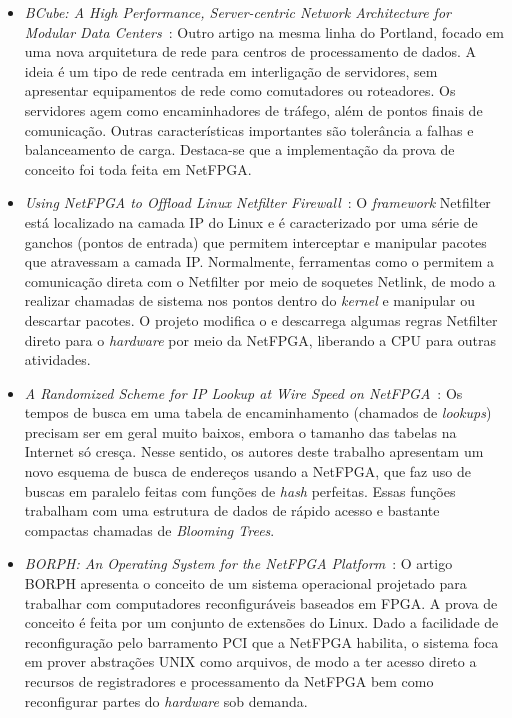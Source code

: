 \begin{itemize}
\item \textit{BCube: A High Performance, Server-centric Network
Architecture for Modular Data
Centers}~\cite{Guo:2009:BHP:1592568.1592577}: Outro artigo na mesma
linha do Portland, focado em uma nova arquitetura de rede para
centros de processamento de dados. A ideia é um tipo de rede
centrada em interligação de servidores, sem apresentar equipamentos
de rede como comutadores ou roteadores. Os servidores agem como
encaminhadores de tráfego, além de pontos finais de comunicação.
Outras características importantes são tolerância a falhas e
balanceamento de carga. Destaca-se que a implementação da prova de
conceito foi toda feita em NetFPGA.

\item \textit{Using NetFPGA to Offload Linux Netfilter
Firewall}~\cite{netfilter}: O \emph{framework} Netfilter está
localizado na camada IP do Linux e é caracterizado por uma série de
ganchos (pontos de entrada) que permitem interceptar e manipular
pacotes que atravessam a camada IP. Normalmente, ferramentas como o
 permitem a comunicação direta com o Netfilter por
meio de soquetes Netlink, de modo a realizar chamadas de sistema nos
pontos dentro do \emph{kernel} e manipular ou descartar pacotes. O
projeto modifica o  e descarrega algumas regras
Netfilter direto para o \emph{hardware} por meio da NetFPGA,
liberando a CPU para outras atividades.

\item \textit{A Randomized Scheme for IP Lookup at Wire Speed on
NetFPGA}~\cite{5502019}: Os tempos de busca em uma tabela de
encaminhamento (chamados de \textit{lookups}) precisam ser em geral
muito baixos, embora o tamanho das tabelas na Internet só cresça.
Nesse sentido, os autores deste trabalho apresentam um novo esquema
de busca de endereços usando a NetFPGA, que faz uso de buscas em
paralelo feitas com funções de \textit{hash} perfeitas. Essas
funções trabalham com uma estrutura de dados de rápido acesso e
bastante compactas chamadas de \textit{Blooming Trees}.

\item \textit{BORPH: An Operating System for the NetFPGA
Platform}~\cite{borph}: O artigo BORPH apresenta o conceito de um
sistema operacional projetado para trabalhar com computadores
reconfiguráveis baseados em FPGA. A prova de conceito é feita por um
conjunto de extensões do Linux. Dado a facilidade de reconfiguração
pelo barramento PCI que a NetFPGA habilita, o sistema foca em prover
abstrações UNIX como arquivos, de modo a ter acesso direto a
recursos de registradores e processamento da NetFPGA bem como
reconfigurar partes do \emph{hardware} sob demanda.


\end{itemize}
